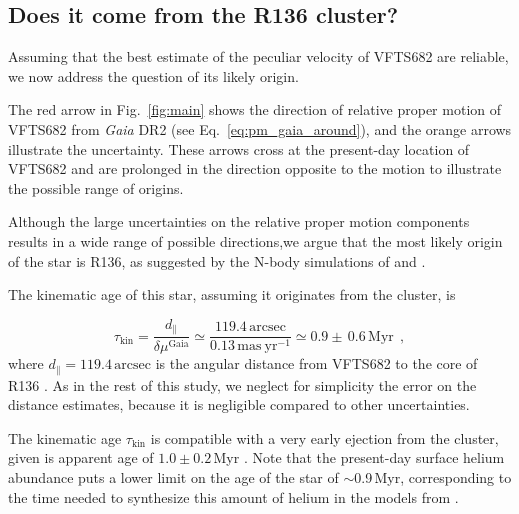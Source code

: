 \documentclass[a4paper,fleqn,usenatbib]{mnras}
\newcommand{\todo}[1]{{\large $\blacksquare$~\textbf{\color{red}[#1]}}~$\blacksquare$}
\DeclareRobustCommand{\Eqref}[1]{Eq.~\ref{#1}}
\DeclareRobustCommand{\Figref}[1]{Fig.~\ref{#1}}
\begin{document}
\subsection{Does it come from the R136 cluster?}
\label{sec:r136_origin}

Assuming that the best estimate of the peculiar velocity of VFTS682
are reliable, we now address the question of its likely origin.

The red arrow in \Figref{fig:main} shows the direction of relative proper motion of
VFTS682 from \emph{Gaia} DR2 (see \Eqref{eq:pm_gaia_around}), and the
orange arrows illustrate the uncertainty. %
These arrows cross at the present-day location of VFTS682 and
are prolonged in the direction opposite to the motion to illustrate
the possible range of origins. %

Although the large uncertainties on the relative proper motion
components results in a wide range of possible directions,we argue that the most likely origin of the star is R136,
as suggested by the N-body simulations of \cite{fujii:11}
and \cite{banerjee:12}.

The kinematic age of this star, assuming it originates from the
cluster, is

\begin{equation}
  \label{eq:kin_age}
  \tau_\mathrm{kin} = \frac{d_\parallel}{\delta\mu^\mathrm{Gaia}} \simeq
  \frac{119.4\,\mathrm{arcsec}}{0.13\,\mathrm{mas\ yr^{-1}}} \simeq 0.9\pm\,0.6\, \mathrm{Myr} \ \ ,
\end{equation}
where $d_\parallel = 119.4\,\mathrm{arcsec}$ is the angular distance from VFTS682 to
the core of R136 \citep[corresponding to $\sim$29\,pc at LMC distance,][]{bestenlehner:11}.
As in the rest of this study, we neglect for
simplicity the error on the distance estimates, because it is negligible compared to other uncertainties.

The kinematic age $\tau_\mathrm{kin}$ is compatible with a very early
ejection from the cluster, given is apparent age
of $1.0\pm 0.2$\,Myr \citep{schneider:18}. %
Note that the
present-day surface helium abundance
\citep[$Y\simeq0.5$,][]{bestenlehner:11, rubio-diez:17} puts a lower
limit on the age of the star of $\sim$0.9\,Myr, corresponding to the time needed to
synthesize this amount of helium in the models from \cite{kohler:15}.
\end{document}
